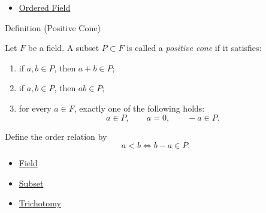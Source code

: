 \begin{dependencies}
\begin{itemize}
  \item \hyperref[def:abstract-ordered-field]{Ordered Field}
\end{itemize}
\end{dependencies}

\begin{definitionbox}{Definition (Positive Cone)}
\begin{definition}
\label{def:positive-cone}
Let $F$ be a field. A subset $P\subset F$ is called a \emph{positive
cone} if it satisfies:
\begin{enumerate}
  \item if $a,b\in P$, then $a+b\in P$;
  \item if $a,b\in P$, then $ab\in P$;
  \item for every $a\in F$, exactly one of the following holds:
  \[
  a\in P,
  \qquad
  a=0,
  \qquad
  -a\in P.
  \]
\end{enumerate}
Define the order relation by
\[
a<b \iff b-a\in P.
\]
\end{definition}
\end{definitionbox}

\begin{dependencies}
\begin{itemize}
  \item \hyperref[def:abstract-field]{Field}
  \item \hyperref[def:subset]{Subset}
  \item \hyperref[def:trichotomy]{Trichotomy}
\end{itemize}
\end{dependencies}
